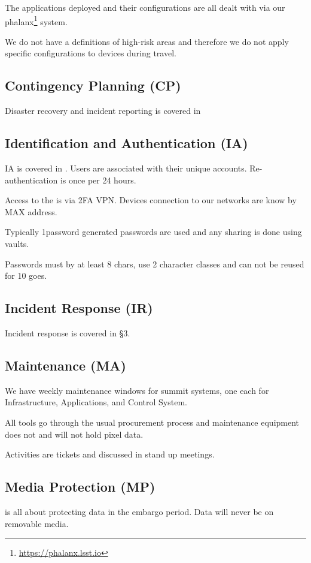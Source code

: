 The applications deployed and their configurations are all dealt with via our phalanx\footnote{\url{https://phalanx.lsst.io}} system.


We do not have a definitions of high-risk areas and therefore we do not apply specific configurations to devices during travel.

\subsection{Contingency Planning (CP)} \label{sec:CP}
Disaster recovery and incident reporting is covered in 

\subsection{Identification and Authentication (IA)} \label{sec:IA}
IA is covered in .
Users are associated with their unique  accounts.
Re-authentication is once per 24 hours.

Access to the \PZ is via 2FA VPN.
Devices connection to our networks are know by MAX address.

Typically 1password generated passwords are used and any sharing is done using vaults.

Passwords must by at least 8 chars, use 2 character classes and can not be reused for 10 goes.

\subsection{Incident Response (IR)} \label{sec:IR}
Incident response is covered in  \S3.

\subsection{Maintenance (MA)} \label{sec:MA}
We have weekly maintenance windows for summit systems, one each for Infrastructure, Applications, and Control System.

All tools go through the usual procurement process and maintenance equipment does not and will not hold pixel data.

Activities are tickets and discussed in stand up meetings.

\subsection{Media Protection (MP)} \label{sec:MP}
\PZ is all about protecting data in the embargo period. Data will never be on removable media.

